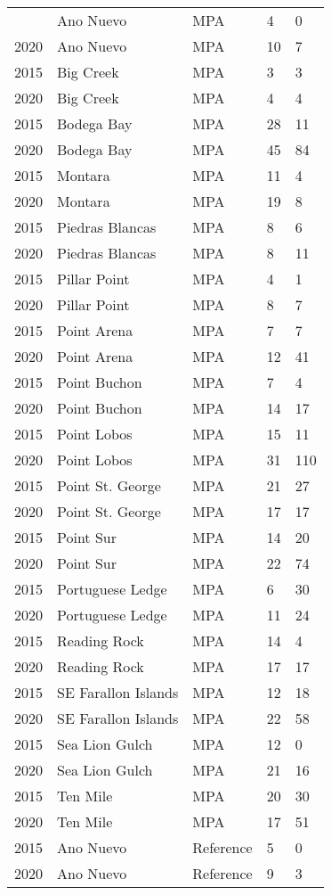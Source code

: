 \documentclass[11pt,
  english,
  letterpaper,
]{article}
\begin{document}
\begin{longtable}[t]{l>{\raggedright\arraybackslash}p{3cm}lll}
\endfoot
\bottomrule
\endlastfoot
2015 & Ano Nuevo & MPA & 4 & 0\\
2020 & Ano Nuevo & MPA & 10 & 7\\
2015 & Big Creek & MPA & 3 & 3\\
2020 & Big Creek & MPA & 4 & 4\\
2015 & Bodega Bay & MPA & 28 & 11\\
2020 & Bodega Bay & MPA & 45 & 84\\
2015 & Montara & MPA & 11 & 4\\
2020 & Montara & MPA & 19 & 8\\
2015 & Piedras Blancas & MPA & 8 & 6\\
2020 & Piedras Blancas & MPA & 8 & 11\\
2015 & Pillar Point & MPA & 4 & 1\\
2020 & Pillar Point & MPA & 8 & 7\\
2015 & Point Arena & MPA & 7 & 7\\
2020 & Point Arena & MPA & 12 & 41\\
2015 & Point Buchon & MPA & 7 & 4\\
2020 & Point Buchon & MPA & 14 & 17\\
2015 & Point Lobos & MPA & 15 & 11\\
2020 & Point Lobos & MPA & 31 & 110\\
2015 & Point St. George & MPA & 21 & 27\\
2020 & Point St. George & MPA & 17 & 17\\
2015 & Point Sur & MPA & 14 & 20\\
2020 & Point Sur & MPA & 22 & 74\\
2015 & Portuguese Ledge & MPA & 6 & 30\\
2020 & Portuguese Ledge & MPA & 11 & 24\\
2015 & Reading Rock & MPA & 14 & 4\\
2020 & Reading Rock & MPA & 17 & 17\\
2015 & SE Farallon Islands & MPA & 12 & 18\\
2020 & SE Farallon Islands & MPA & 22 & 58\\
2015 & Sea Lion Gulch & MPA & 12 & 0\\
2020 & Sea Lion Gulch & MPA & 21 & 16\\
2015 & Ten Mile & MPA & 20 & 30\\
2020 & Ten Mile & MPA & 17 & 51\\
2015 & Ano Nuevo & Reference & 5 & 0\\
2020 & Ano Nuevo & Reference & 9 & 3\\

\end{longtable}
\end{document}
